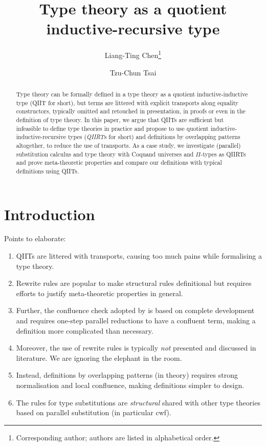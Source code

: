 \documentclass[a4paper,UKenglish,numberwithinsect,cleveref,thm-restate]{lipics-v2021}
\title{Type theory as a quotient inductive-recursive type}
\author{Liang-Ting Chen\footnote{Corresponding author; authors are listed in alphabetical order.}}{Institute of Information Science, Academia Sinica, Taiwan \and \url{http://l-tchen.github.io}}{ltchen@iis.sinica.edu.tw}{https://orcid.org/0000-0002-3250-1331}{Supported by the National Science and Technology Council of Taiwan under grant NSTC [funding]}
\author{Tzu-Chun Tsai}{Institute of Information Science, Academia Sinica, Taiwan}{gene0905@icloud.com}{}{Supported by the National Science and Technology Council of Taiwan under grant NSTC 112-2221-E-001-003-MY3.}
\begin{document}
\maketitle

\begin{abstract}
  Type theory can be formally defined in a type theory as a quotient inductive-inductive type (QIIT for short), but terms are littered with explicit transports along equality constructors, typically omitted and retouched in presentation, in proofs or even in the definition of type theory.
  In this paper, we argue that QIITs are sufficient but infeasible to define type theories in practice and propose to use quotient inductive-inductive-recursive types (\emph{QIIRT}s for short) and definitions by overlapping patterns altogether, to reduce the use of transports.
  As a case study, we investigate (parallel) substitution calculus and type theory with Coquand universes and $\Pi$-types as QIIRTs and prove meta-theoretic properties and compare our definitions with typical definitions using QIITs.
\end{abstract}

\section{Introduction} \label{sec:intro}
Points to elaborate:
\begin{enumerate}
  \item QIITs are littered with transports, causing too much pains while formalising a type theory.
  \item Rewrite rules are popular to make structural rules definitional but requires efforts to justify meta-theoretic properties in general.
  \item Further, the confluence check adopted by \Agda is based on complete development and requires one-step parallel reductions to have a confluent term, making a definition more complicated than necessary.
  \item Moreover, the use of rewrite rules is typically \emph{not} presented and discussed in literature. We are ignoring the elephant in the room.
  \item Instead, definitions by overlapping patterns (in theory) requires strong normalisation and local confluence, making definitions simpler to design.
  \item The rules for type substitutions are \emph{structural} shared with other type theories based on parallel substitution (in particular cwf).
  
\end{enumerate}
\end{document}
